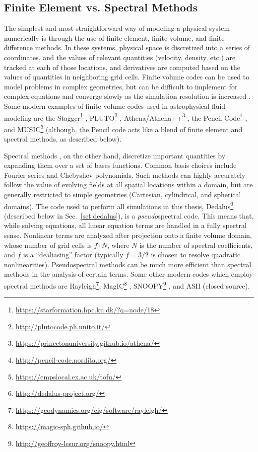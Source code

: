 \subsection{Finite Element vs. Spectral Methods}
The simplest and most straightforward way of modeling a physical system numerically is through the use of finite element, finite volume, and finite difference methods.
In these systems, physical space is discretized into a series of coordinates, and the values of relevant quantities (velocity, density, etc.) are tracked at each of those locations, and derivatives are computed based on the values of quantities in neighboring grid cells.
Finite volume codes can be used to model problems in complex geometries, but can be difficult to implement for complex equations and converge slowly as the simulation resolution is increased \citep{burns&all2019}.
Some modern examples of finite volume codes used in astrophysical fluid modeling are the Stagger\footnote{\url{https://starformation.hpc.ku.dk/?q=node/18}} \citep{galsgaard2011}, PLUTO\footnote{\url{http://plutocode.ph.unito.it/}} \citep{mignone&all2012}, Athena/Athena++\footnote{\url{https://princetonuniversity.github.io/athena/}} \citep{stone&all2008, stone&all2019}, the Pencil Code\footnote{\url{http://pencil-code.nordita.org/}} \citep{brandenburg&dobler2010}, and MUSIC\footnote{\url{https://empslocal.ex.ac.uk/tofu/}} \citep{goffrey&all2017} (although, the Pencil code acts like a blend of finite element and spectral methods, as described below).

Spectral methods \citep[covered in detail in, e.g.][]{gottlieb&all1978, boyd2001}, on the other hand, discretize important quantities by expanding them over a set of bases functions.
Common basis choices include Fourier series and Chebyshev polynomials.
Such methods can highly accurately follow the value of evolving fields at all spatial locations within a domain, but are generally restricted to simple geometries (Cartesian, cylindrical, and spherical domains).
The code used to perform all simulations in this thesis, Dedalus\footnote{\url{http://dedalus-project.org/}} (described below in Sec.~\ref{sct:dedalus}), is a \emph{pseudo}spectral code.
This means that, while solving equations, all linear equation terms are handled in a fully spectral sense.
Nonlinear terms are analyzed after projection onto a finite volume domain, whose number of grid cells is $f\cdot N$, where $N$ is the number of spectral coefficients, and $f$ is a ``dealiasing'' factor (typically $f = 3/2$ is chosen to resolve quadratic nonlinearities). 
Pseudospectral methods \citep[covered in detail in, e.g.][]{fornberg1996} can be much more efficient than spectral methods in the analysis of certain terms.
Some other modern codes which employ spectral methods are Rayleigh\footnote{\url{https://geodynamics.org/cig/software/rayleigh/}}, MagIC\footnote{\url{https://magic-sph.github.io/}} \citep{wicht&all2017}, SNOOPY\footnote{\url{http://geoffroy-lesur.org/snoopy.html}} \citep{lesur2015}, and ASH (closed source).

